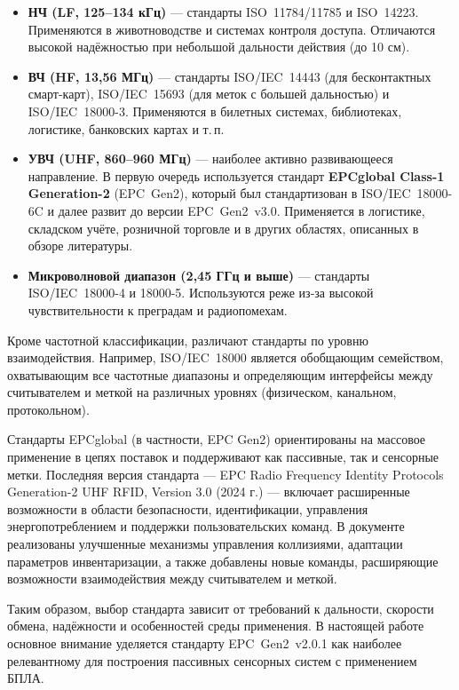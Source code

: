 \documentclass[12pt]{article}
\theoremstyle{definition}
\begin{document}
\begin{itemize}
    \item \textbf{НЧ (LF, 125–134 кГц)} --- стандарты ISO~11784/11785 и ISO~14223. Применяются в животноводстве и системах контроля доступа. Отличаются высокой надёжностью при небольшой дальности действия (до 10 см).
    
    \item \textbf{ВЧ (HF, 13{,}56 МГц)} --- стандарты ISO/IEC~14443 (для бесконтактных смарт-карт), ISO/IEC~15693 (для меток с большей дальностью) и ISO/IEC~18000-3. Применяются в билетных системах, библиотеках, логистике, банковских картах и т.\,п.

    \item \textbf{УВЧ (UHF, 860–960 МГц)} --- наиболее активно развивающееся направление. В первую очередь используется стандарт \textbf{EPCglobal Class-1 Generation-2} (EPC~Gen2), который был стандартизован в ISO/IEC~18000-6C и далее развит до версии EPC~Gen2~v3.0. Применяется в логистике, складском учёте, розничной торговле и в других областях, описанных в обзоре литературы.

    \item \textbf{Микроволновой диапазон (2{,}45 ГГц и выше)} --- стандарты ISO/IEC~18000-4 и 18000-5. Используются реже из-за высокой чувствительности к преградам и радиопомехам.
\end{itemize}

Кроме частотной классификации, различают стандарты по уровню взаимодействия. Например, ISO/IEC~18000 является обобщающим семейством, охватывающим все частотные диапазоны и определяющим интерфейсы между считывателем и меткой на различных уровнях (физическом, канальном, протокольном).

Стандарты EPCglobal (в частности, EPC Gen2) ориентированы на массовое применение в цепях поставок и поддерживают как пассивные, так и сенсорные метки. Последняя версия стандарта — EPC Radio Frequency Identity Protocols Generation-2 UHF RFID, Version 3.0 (2024 г.) — включает расширенные возможности в области безопасности, идентификации, управления энергопотреблением и поддержки пользовательских команд. В документе реализованы улучшенные механизмы управления коллизиями, адаптации параметров инвентаризации, а также добавлены новые команды, расширяющие возможности взаимодействия между считывателем и меткой.

Таким образом, выбор стандарта зависит от требований к дальности, скорости обмена, надёжности и особенностей среды применения. В настоящей работе основное внимание уделяется стандарту EPC~Gen2~v2.0.1 как наиболее релевантному для построения пассивных сенсорных систем с применением БПЛА.
\end{document}
